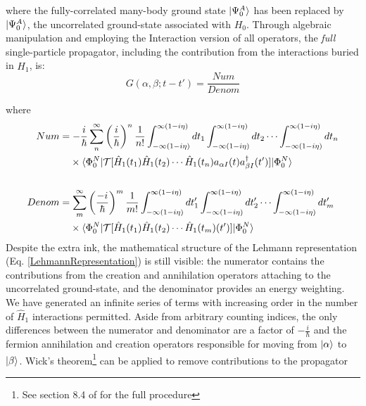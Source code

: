 \noindent
where the fully-correlated many-body ground state $\ket{\Psi^{A}_{0}}$ has been replaced by
$\ket{\Psi^{A}_{0}}$, the uncorrelated ground-state associated with $H_{0}$. Through algebraic
manipulation and employing the Interaction version of all operators,
the \textit{full} single-particle propagator, including the
contribution from the interactions buried in $\hat{H_{1}}$, is:
\begin{equation} \label{FullSPPropagator}
    G(\alpha, \beta; t-t') = \frac{Num}{Denom}
\end{equation}

\noindent
where
\begin{equation*}
    \begin{split}
        Num & = -\frac{i}{\hbar}\sum^{\infty}_{n}\left(\frac{i}{\hbar}\right)^{n}\frac{1}{n!}
    \int_{-\infty(1-i\eta)}^{\infty(1-i\eta)} dt_{1}
    \int_{-\infty(1-i\eta)}^{\infty(1-i\eta)} dt_{2} \cdots
    \int_{-\infty(1-i\eta)}^{\infty(1-i\eta)} dt_{n}\\
    & \phantom{ {}= } \times \braket{\Phi^{N}_{0}|\mathcal{T}[\hat{H}_{1}(t_{1})
    \hat{H}_{1}(t_{2}) \cdots \hat{H}_{1}(t_{n})a_{\alpha I}(t)a^{\dagger}_{\beta
    I}(t')]|\Phi^{N}_{0}}\\\\
    Denom & = \sum^{\infty}_{m}\left(\frac{-i}{\hbar}\right)^{m}\frac{1}{m!}
        \int_{-\infty(1-i\eta)}^{\infty(1-i\eta)} dt'_{1}
        \int_{-\infty(1-i\eta)}^{\infty(1-i\eta)} dt'_{2} \cdots
        \int_{-\infty(1-i\eta)}^{\infty(1-i\eta)} dt'_{m}\\
        & \phantom{ {}= } \times \braket{\Phi^{N}_{0}|
        \mathcal{T}[\hat{H}_{1}(t_{1})
        \hat{H}_{1}(t_{2}) \cdots \hat{H}_{1}(t_{m})(t')]|\Phi^{N}_{0}}
    \end{split}
\end{equation*}
\noindent
Despite the extra ink, the mathematical structure of the Lehmann
representation (Eq. \ref{LehmannRepresentation}) is still visible: the numerator contains
the contributions from the creation and annihilation operators attaching to the uncorrelated
ground-state, and the denominator provides an energy weighting. We have generated an infinite
series of terms with increasing order in the number of $\hat{H}_{1}$ interactions permitted.
Aside from arbitrary counting indices,
the only differences between the numerator and denominator are a
factor of $-\frac{i}{\hbar}$ and the fermion annihilation and creation operators
responsible for moving from $\ket{\alpha}$ to $\ket{\beta}$. Wick's
theorem\footnote{See section 8.4 of \cite{MBTE}
for the full procedure} can be applied to remove contributions to the propagator
